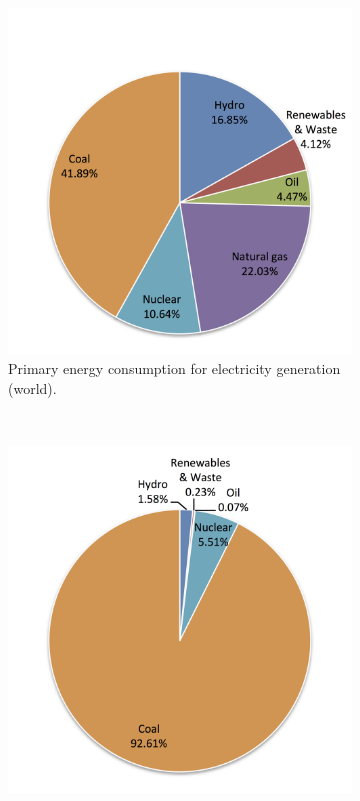 \begin{figure}[!htbp]
        \centering                
        \begin{subfigure}[b]{0.45\textwidth}
                \centering
                \includegraphics[width=1\textwidth]{FIG/ElectrWorld}
                \caption{Primary energy consumption for electricity generation (world).}\label{ElectrWorld}
        \end{subfigure}
        ~
        \begin{subfigure}[b]{0.45\textwidth}
                \centering
                \includegraphics[width=1\textwidth]{FIG/ElectrSA}

\end{subfigure}
\end{figure}
